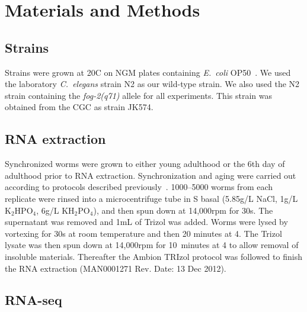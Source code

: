 \documentclass[10pt,letterpaper,twocolumn]{article}
\newcommand{\cel}{\emph{C.~elegans}}
\newcommand{\fog}{\emph{fog-2}}
\newcommand{\ecol}{\emph{E.~coli}}
\begin{document}
\section*{Materials and Methods}
\label{sec:materials_methods}

\subsection*{Strains}
\label{sub:Strains}
Strains were grown at 20\degree{}C on NGM plates containing \ecol{} OP50~\cite{Brenner1974}. We used the laboratory \cel{} strain N2 as our wild-type strain. We also used the N2 strain containing the \fog{}\emph{(q71)} allele for all experiments. This strain was obtained from the CGC as strain JK574.


\subsection*{RNA extraction}
\label{sb:rna_extraction}
Synchronized worms were grown to either young adulthood or the 6th day of adulthood prior to RNA extraction. Synchronization and aging were carried out according to protocols described previously~\cite{Leighton2014}. 1000--5000 worms from each replicate were rinsed into a microcentrifuge tube in S basal (5.85g/L NaCl, 1g/L $\mathrm{K}_2\mathrm{HPO}_4$, 6g/L $\mathrm{KH}_2\mathrm{PO}_4$), and then spun down at 14,000rpm for 30s. The supernatant was removed and 1mL of Trizol was added. Worms were lysed by vortexing for 30s at room temperature and then 20 minutes at 4\degree. The Trizol lysate was then spun down at 14,000rpm for 10~minutes at 4\degree{} to allow removal of insoluble materials. Thereafter the Ambion TRIzol protocol was followed to finish the RNA extraction (MAN0001271 Rev. Date: 13 Dec 2012).

\subsection*{RNA-seq}
\label{sb:rna_seq}
\end{document}
